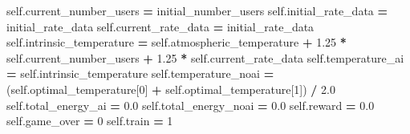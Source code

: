 \documentclass[]{book}
\newenvironment{Shaded}{\begin{snugshade}}{\end{snugshade}}
\newcommand{\DecValTok}[1]{\textcolor[rgb]{0.00,0.00,0.81}{#1}}
\newcommand{\FloatTok}[1]{\textcolor[rgb]{0.00,0.00,0.81}{#1}}
\newcommand{\NormalTok}[1]{#1}
\newcommand{\OperatorTok}[1]{\textcolor[rgb]{0.81,0.36,0.00}{\textbf{#1}}}
\newcommand{\VariableTok}[1]{\textcolor[rgb]{0.00,0.00,0.00}{#1}}
\begin{document}
\begin{Shaded}
\begin{Highlighting}[]
        \VariableTok{self}\NormalTok{.current_number_users }\OperatorTok{=}\NormalTok{ initial_number_users}
        \VariableTok{self}\NormalTok{.initial_rate_data }\OperatorTok{=}\NormalTok{ initial_rate_data}
        \VariableTok{self}\NormalTok{.current_rate_data }\OperatorTok{=}\NormalTok{ initial_rate_data}
        \VariableTok{self}\NormalTok{.intrinsic_temperature }\OperatorTok{=} \VariableTok{self}\NormalTok{.atmospheric_temperature}
                                     \OperatorTok{+} \FloatTok{1.25} \OperatorTok{*} \VariableTok{self}\NormalTok{.current_number_users}
                                     \OperatorTok{+} \FloatTok{1.25} \OperatorTok{*} \VariableTok{self}\NormalTok{.current_rate_data}
        \VariableTok{self}\NormalTok{.temperature_ai }\OperatorTok{=} \VariableTok{self}\NormalTok{.intrinsic_temperature}
        \VariableTok{self}\NormalTok{.temperature_noai }\OperatorTok{=}\NormalTok{ (}\VariableTok{self}\NormalTok{.optimal_temperature[}\DecValTok{0}\NormalTok{]}
                                \OperatorTok{+} \VariableTok{self}\NormalTok{.optimal_temperature[}\DecValTok{1}\NormalTok{]) }\OperatorTok{/} \FloatTok{2.0}
        \VariableTok{self}\NormalTok{.total_energy_ai }\OperatorTok{=} \FloatTok{0.0}
        \VariableTok{self}\NormalTok{.total_energy_noai }\OperatorTok{=} \FloatTok{0.0}
        \VariableTok{self}\NormalTok{.reward }\OperatorTok{=} \FloatTok{0.0}
        \VariableTok{self}\NormalTok{.game_over }\OperatorTok{=} \DecValTok{0}
        \VariableTok{self}\NormalTok{.train }\OperatorTok{=} \DecValTok{1}
\end{Highlighting}
\end{Shaded}
\end{document}
